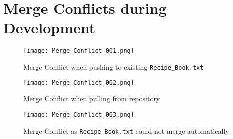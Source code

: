 \documentclass[a4paper,twoside,12pt]{article}
\begin{document}
\begin{comment}
\subsection{Making use of GitHub Front-End Functionality}
\paragraph{GitHub offers extra features, which were explored to further aid development of the assignment}
\subsubsection{Using Markdown for \texttt{README}}
\paragraph{The Markdown Integration built in GitHub, allowed for features, most significantly Tables \& Task Lists, that helped in defining the objectives required to complete the assignment}
\subsubsection{Using Issues to Resolve Obstacles}
\paragraph{Issues were used to put forward problems that came about, while using Git. Issues opened included the requirement for team members and difficulties in creating a merge conflict.}
\end{comment}

\pagebreak[4]
\section{Merge Conflicts during Development}
\begin{figure}[ht!]
	\centering
	\texttt{[image: Merge\_Conflict\_001.png]}
	\caption{Merge Conflict when pushing to existing \texttt{Recipe\_Book.txt}}
\end{figure}
\begin{figure}[ht!]
	\centering
	\texttt{[image: Merge\_Conflict\_002.png]}
	\caption{Merge Conflict when pulling from repository}
\end{figure}
\begin{figure}[ht!]
	\centering
	\texttt{[image: Merge\_Conflict\_003.png]}
	\caption{Merge Conflict as \texttt{Recipe\_Book.txt} could not merge automatically}
\end{figure}
\end{document}
